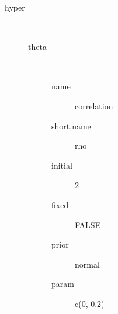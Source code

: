 \begin{description}
	\item[hyper]\ 
	 \begin{description}
	 	\item[theta]\ 
	 	 \begin{description}
	 	 	 \item[ name ] correlation 
	 	 	 \item[ short.name ] rho 
	 	 	 \item[ initial ] 2 
	 	 	 \item[ fixed ] FALSE 
	 	 	 \item[ prior ] normal 
	 	 	 \item[ param ] c(0, 0.2) 
	 	 \end{description}
	 \end{description}
\end{description}
